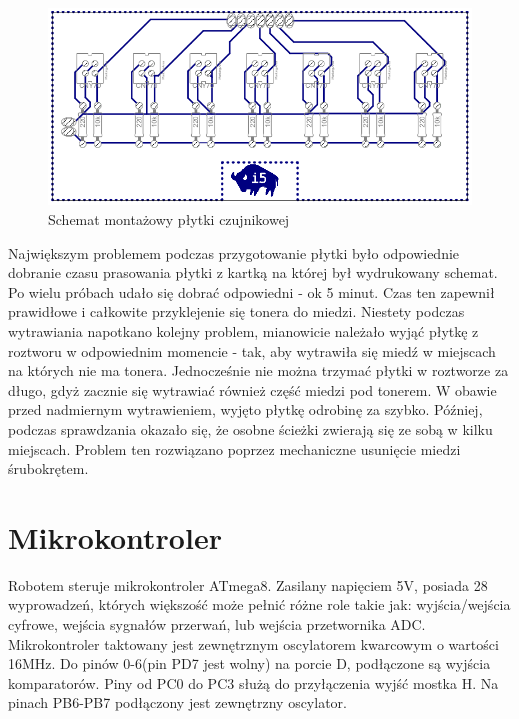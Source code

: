 \documentclass[11pt,a4paper]{article}
\begin{document}
    \begin{figure}[H]
    \includegraphics[scale=0.67]{schemat_czujniki_m}
    \caption{Schemat montażowy płytki czujnikowej}
  
  
\end{figure}

Największym problemem podczas przygotowanie płytki było odpowiednie dobranie czasu prasowania płytki z kartką na której był wydrukowany schemat. 
Po wielu próbach udało się dobrać odpowiedni - ok 5 minut. Czas ten zapewnił prawidłowe i całkowite przyklejenie się tonera do miedzi. 
Niestety podczas wytrawiania napotkano kolejny problem, mianowicie należało wyjąć płytkę z roztworu w odpowiednim momencie - tak, aby wytrawiła się miedź w miejscach na których nie ma tonera. Jednocześnie nie można trzymać płytki w roztworze za długo, gdyż zacznie się wytrawiać również część miedzi pod tonerem. W obawie przed nadmiernym wytrawieniem, wyjęto płytkę odrobinę za szybko. Później, podczas sprawdzania okazało się, że osobne ścieżki zwierają się ze sobą w kilku miejscach. Problem ten rozwiązano poprzez mechaniczne usunięcie miedzi śrubokrętem.

\section{Mikrokontroler}
  Robotem steruje mikrokontroler ATmega8. Zasilany napięciem 5V, posiada 28 wyprowadzeń, których większość może pełnić różne role takie jak: wyjścia/wejścia cyfrowe, wejścia sygnałów przerwań, lub wejścia przetwornika ADC.
  Mikrokontroler taktowany jest zewnętrznym oscylatorem kwarcowym o wartości 16MHz.
  Do pinów 0-6(pin PD7 jest wolny) na porcie D, podłączone są wyjścia komparatorów. Piny od PC0 do PC3 służą do przyłączenia wyjść mostka H.
  Na pinach PB6-PB7 podłączony jest zewnętrzny oscylator.
   
\end{document}
